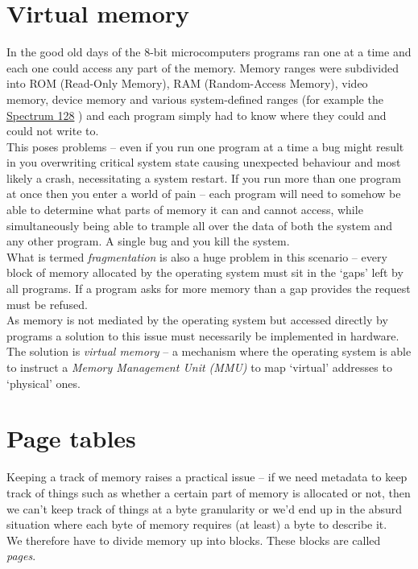 \section{Virtual memory}

In the good old days of the 8-bit microcomputers programs ran one at a time and
each one could access any part of the memory. Memory ranges were subdivided into
ROM (Read-Only Memory), RAM (Random-Access Memory), video memory, device memory
and various system-defined ranges (for example the
\href{https://worldofspectrum.org/ZXSpectrum128+3Manual/chapter8pt24.html}{Spectrum
  128} \autocite{spectrum128-manual:c8pt24}) and each program simply had to know
where they could and could not write to.\\

This poses problems -- even if you run one program at a time a bug might result in
you overwriting critical system state causing unexpected behaviour and most
likely a crash, necessitating a system restart. If you run more than one program
at once then you enter a world of pain -- each program will need to somehow be
able to determine what parts of memory it can and cannot access, while
simultaneously being able to trample all over the data of both the system and
any other program. A single bug and you kill the system.\\

What is termed \emph{fragmentation} is also a huge problem in this scenario --
every block of memory allocated by the operating system must sit in the `gaps'
left by all programs. If a program asks for more memory than a gap provides the
request must be refused.\\

As memory is not mediated by the operating system but accessed directly by
programs a solution to this issue must necessarily be implemented in
hardware. The solution is \emph{virtual memory} -- a mechanism where the
operating system is able to instruct a \emph{Memory Management Unit (MMU)} to
map `virtual' addresses to `physical' ones.

\section{Page tables}
Keeping a track of memory raises a practical issue -- if we need metadata to
keep track of things such as whether a certain part of memory is allocated or
not, then we can't keep track of things at a byte granularity or we'd end up in
the absurd situation where each byte of memory requires (at least) a byte to
describe it.\\

We therefore have to divide memory up into blocks. These blocks are called
\emph{pages}.
